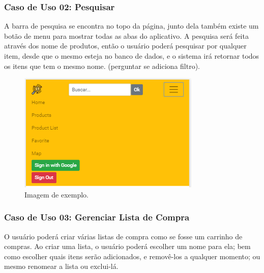 \subsubsection{Caso de Uso 02: Pesquisar}

A barra de pesquisa se encontra no topo da página, junto dela também existe um botão de menu para mostrar todas as abas do aplicativo. A pesquisa será feita através dos nome de produtos, então o usuário poderá pesquisar por qualquer item, desde que o mesmo esteja no banco de dados, e o sistema irá retornar todos os itens que tem o mesmo nome. (perguntar se adiciona filtro).

\begin{figure}[!htb]
\centering
\caption{Imagem de exemplo.}
\includegraphics[width=\linewidth]{figuras/tela-menu.png}
\end{figure}

\subsubsection{Caso de Uso 03: Gerenciar Lista de Compra}

O usuário poderá criar várias listas de compra como se fosse um carrinho de compras. Ao criar uma lista, o usuário poderá escolher um nome para ela; bem como escolher quais itens serão adicionados, e removê-los a qualquer momento; ou mesmo renomear a lista ou exclui-lá.


